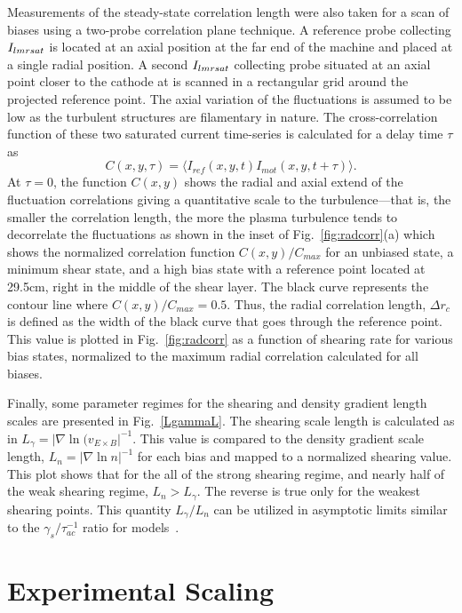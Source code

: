 \documentclass[aip,pop,amsmath,amssymb,reprint,superscriptaddress]{revtex4-1} %
\begin{document}
Measurements of the steady-state correlation length were also taken for a scan of biases using a two-probe correlation plane technique. A reference probe collecting $I_{\rmdefault sat}$ is located at an axial position at the far end of the machine and placed at a single radial position. A second $I_{\rmdefault sat}$ collecting probe situated at an axial point closer to the cathode at is scanned in a rectangular grid around the projected reference point. The axial variation of the fluctuations is assumed to be low as the turbulent structures are filamentary in nature. The cross-correlation function of these two saturated current time-series is calculated for a delay time $\tau$ as
%
\begin{equation}
C(x,y,\tau) = \langle I_{ref}(x,y,t)I_{mot}(x,y,t+\tau)\rangle.
\label{eq:time_correlation}
\end{equation}
%
At $\tau = 0$, the function $C(x,y)$ shows the radial and axial extend of the fluctuation correlations giving a quantitative scale to the turbulence---that is, the smaller the correlation length, the more the plasma turbulence tends to decorrelate the fluctuations as shown in the inset of Fig.~\ref{fig:radcorr}(a) which shows the normalized correlation function $C(x,y)/C_{max}$ for an unbiased state, a minimum shear state, and a high bias state with a reference point located at 29.5cm, right in the middle of the shear layer. The black curve represents the contour line where $C(x,y)/C_{max} = 0.5$. Thus, the radial correlation length, $\Delta r_{c}$ is defined as the width of the black curve that goes through the reference point. This value is plotted in Fig.~\ref{fig:radcorr} as a function of shearing rate for various bias states, normalized to the maximum radial correlation calculated for all biases.

Finally, some parameter regimes for the shearing and density gradient length scales are presented in Fig.~\ref{LgammaL}. The shearing scale length is calculated as in $L_{\gamma} = |\nabla \ln(v_{E\times B}|^{-1}.$ This value is compared to the density gradient scale length, $L_{n} = |\nabla \ln{n}|^{-1}$ for each bias and mapped to a normalized shearing value. This plot shows that for the all of the strong shearing regime, and nearly half of the weak shearing regime, $L_{n} > L_{\gamma}$. The reverse is true only for the weakest shearing points. This quantity $L_{\gamma}/L_{n}$ can be utilized in asymptotic limits similar to the $\gamma_{s}/\tau_{ac}^{-1}$ ratio for models~\cite{leconte06}.

\section{Experimental Scaling}
\end{document}
